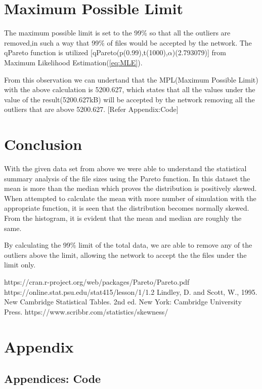 \documentclass[11pt]{article}
\begin{document}
\section{Maximum Possible Limit}

\par The maximum possible limit is set to the 99\% so that all the outliers are removed,in such a way that 99\% of
files would be accepted by the network.
The qPareto function is utilized [qPareto(p(0.99),t(1000),$\alpha$)(2.793079)] from Maximum Likelihood Estimation(\ref{eq:MLE}).

\par From this observation we can undertand that the MPL(Maximum Possible Limit) with the above calculation is 5200.627, which states that all the values under the value of the result(5200.627kB) will be accepted by the network removing all the outliers that are above 5200.627. [Refer Appendix:Code]

\section{Conclusion}

\par With the given data set from above we were able to understand the statistical summary analysis of the file sizes using the Pareto function. In this dataset the mean is more than the median which proves the distribution is positively skewed. When attempted to calculate the mean with more number of simulation with the appropriate function, it is seen that the distribution becomes normally skewed. From the histogram, it is evident that the mean and median are roughly the same.
\par By calculating the 99\% limit of the total data, we are able to remove any of the outliers above the limit, allowing the network to accept the the files under the limit only.

\begin{thebibliography}{}
https://cran.r-project.org/web/packages/Pareto/Pareto.pdf
https://online.stat.psu.edu/stat415/lesson/1/1.2
Lindley, D. and Scott, W., 1995. New Cambridge Statistical Tables. 2nd ed. New York: Cambridge University Press.
https://www.scribbr.com/statistics/skewness/ 
\end{thebibliography}

\newpage 
\section{Appendix}
\subsection{Appendices: Code}

\end{document}

